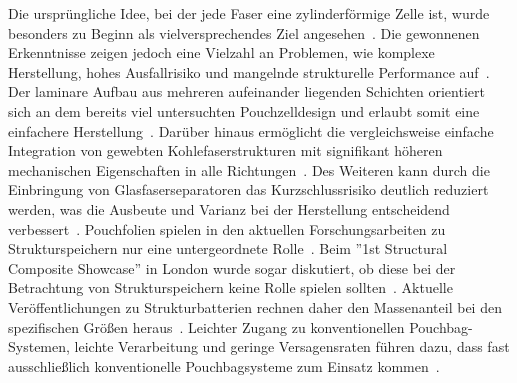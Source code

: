 Die ursprüngliche Idee, bei der jede Faser eine zylinderförmige Zelle ist, wurde besonders zu Beginn als vielversprechendes Ziel angesehen~\cite{Ekstedt2010, Leijonmarck2013, Asp2014}. Die gewonnenen Erkenntnisse zeigen jedoch eine Vielzahl an Problemen, wie komplexe Herstellung, hohes Ausfallrisiko und mangelnde strukturelle Performance auf~\cite{Asp2015,Johannisson2018,Asp2021, Ye2024}. Der laminare Aufbau aus mehreren aufeinander liegenden Schichten orientiert sich an dem bereits viel untersuchten Pouchzelldesign und erlaubt somit eine einfachere Herstellung~\cite{Johannisson2018, Xu2022, Siraj2023}. Darüber hinaus ermöglicht die vergleichsweise einfache Integration von gewebten Kohlefaserstrukturen mit signifikant höheren mechanischen Eigenschaften in alle Richtungen~\cite{Xu2022}. Des Weiteren kann durch die Einbringung von Glasfaserseparatoren das Kurzschlussrisiko deutlich reduziert werden, was die Ausbeute und Varianz bei der Herstellung entscheidend verbessert~\cite{Siraj2023}. Pouchfolien spielen in den aktuellen Forschungsarbeiten zu Strukturspeichern nur eine untergeordnete Rolle~\cite{Jin2023}. Beim ''1st Structural Composite Showcase'' in London wurde sogar diskutiert, ob diese bei der Betrachtung von Strukturspeichern keine Rolle spielen sollten~\cite{Asp2024}. Aktuelle Veröffentlichungen zu Strukturbatterien rechnen daher den Massenanteil bei den spezifischen Größen heraus~\cite{Danzi2021,Ye2024}. Leichter Zugang zu konventionellen Pouchbag-Systemen, leichte Verarbeitung und geringe Versagensraten führen dazu, dass fast ausschließlich konventionelle Pouchbagsysteme zum Einsatz kommen~\cite{Jin2023,Ye2024}.

